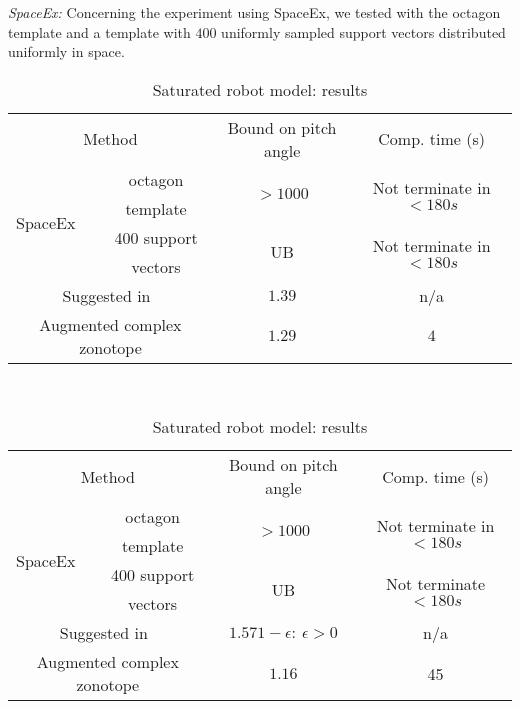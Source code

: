 \emph{SpaceEx:      } Concerning
the experiment using SpaceEx, we tested with the octagon template and
a template with $400$ uniformly sampled support vectors distributed
uniformly in space.  
\begin{table}
\begin{minipage}{1\textwidth}
\centering
\begin{tabular}{|l|c|c|c|}
\hline
\multicolumn{2}{|c|}{\multirow{2}{*}{Method}} &
\multirow{2}{*}{Bound on pitch angle} & \multirow{2}{*}{Comp. time (s)}\\
\multicolumn{2}{|c|}{} & & \\
\hline
\multirow{4}{*}{SpaceEx} & octagon & \multirow{2}{*}{$>1000$} &
\multirow{2}{*}{Not terminate in $<180s$}\\
& template & & \\
\cline{2-4}
& 400 support & \multirow{2}{*}{UB} & \multirow{2}{*}{Not terminate in
  $<180s$}\\
& vectors & &\\
\hline
\multicolumn{2}{|c|}{\multirow{2}{*}{Suggested in~\cite{heinz2014benchmark}}} &
\multirow{2}{*}{$1.39$} & \multirow{2}{*}{n/a}\\
\multicolumn{2}{|c|}{} & &\\
\hline
\multicolumn{2}{|c|}{\multirow{2}{*}{Augmented complex zonotope}} & \multirow{2}{*}{$1.29$} &
\multirow{2}{*}{$4$}\\
\multicolumn{2}{|c|}{} & & \\
\hline
\end{tabular}
\caption{Unsaturated robot model: results}
~\label{tab:robot-unsaturated}
\end{minipage}
{\vspace{1em}
\begin{minipage}{1\textwidth}
\centering
\begin{tabular}{|l|c|c|c|}
\hline
\multicolumn{2}{|c|}{\multirow{2}{*}{Method}} &
\multirow{2}{*}{Bound on pitch angle} & \multirow{2}{*}{Comp. time (s)}\\
\multicolumn{2}{|c|}{} & & \\
\hline
\multirow{4}{*}{SpaceEx} & octagon & \multirow{2}{*}{$>1000$} &
\multirow{2}{*}{Not terminate in $<180s$}\\
& template & & \\
\cline{2-4}
& 400 support & \multirow{2}{*}{UB} & \multirow{2}{*}{Not terminate $<180s$}\\
& vectors & & \\
\hline
\multicolumn{2}{|c|}{\multirow{2}{*}{Suggested in~\cite{heinz2014benchmark}}} &
\multirow{2}{*}{$1.571-\epsilon:~\epsilon>0$} & \multirow{2}{*}{n/a}\\
\multicolumn{2}{|c|}{} &  &\\
\hline
\multicolumn{2}{|c|}{\multirow{2}{*}{Augmented complex zonotope}} & \multirow{2}{*}{$1.16$} &
\multirow{2}{*}{45}\\
\multicolumn{2}{|c|}{} & &\\
\hline
\end{tabular}
\caption{Saturated robot model: results}
~\label{tab:robot-saturated}
\end{minipage}
}
\end{table}


